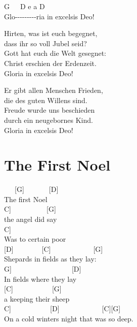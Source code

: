 \documentclass[
  letterpaper,
  twoside=false]{scrbook}
\begin{document}
G~~~D e a D\\
Glo-\/-\/-\/-\/-\/-\/-\/-\/-ria in excelsis Deo!

Hirten, was ist euch begegnet,\\
dass ihr so voll Jubel seid?\\
Gott hat euch die Welt gesegnet:\\
Christ erschien der Erdenzeit.\\
Gloria in excelsis Deo!

Er gibt allen Menschen Frieden,\\
die des guten Willens sind.\\
Freude wurde uns beschieden\\
durch ein neugebornes Kind.\\
Gloria in excelsis Deo!

\hypertarget{the-first-noel}{%
\chapter{The First Noel}\label{the-first-noel}}

~~~{[}G{]}~~~~~~~{[}D{]}\\
The first Noel\\
\hspace*{0.333em}\hspace*{0.333em}\hspace*{0.333em}{[}C{]}~~~~~~~~~~{[}G{]}\\
the angel did say\\
\hspace*{0.333em}\hspace*{0.333em}\hspace*{0.333em}\hspace*{0.333em}\hspace*{0.333em}\hspace*{0.333em}{[}C{]}\\
Was to certain poor\\
{[}D{]}~~~~~~~~{[}C{]}~~~~~~~~~~~~{[}G{]}\\
Shepards in fields as they lay:\\
\hspace*{0.333em}\hspace*{0.333em}{[}G{]}~~~~~~~~~~~~~~~~~{[}D{]}\\
In fields where they lay\\
{[}C{]}~~~~~~~~~~~{[}G{]}\\
a keeping their sheep\\
\hspace*{0.333em}\hspace*{0.333em}\hspace*{0.333em}\hspace*{0.333em}{[}C{]}~~~~~~~~~~~{[}D{]}~~~~~~~~~~~~{[}C{]}{[}G{]}\\
On a cold winter\textquotesingle s night that was so deep.
\end{document}
